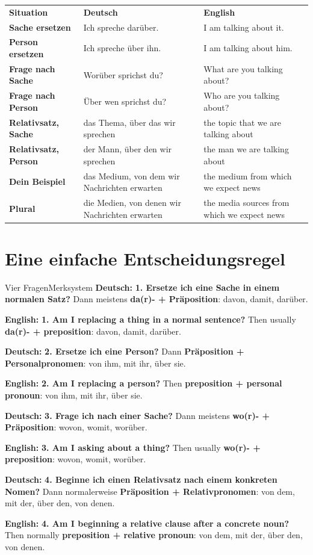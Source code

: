 \documentclass[a4paper,11pt]{article}
\newcommand{\GermanText}[1]{\textbf{Deutsch: }#1\par}
\newcommand{\EnglishText}[1]{{\small\color{SoftGray}\textbf{English: }#1\par}}
\begin{document}
        \begin{longtable}{>{\bfseries}p{3.3cm}|p{5.2cm}|p{5.2cm}}
            \rowcolor{HeaderBlueDark}
            \color{white}\textbf{Situation} &
            \color{white}\textbf{Deutsch} &
            \color{white}\textbf{English} \\
            Sache ersetzen & Ich spreche darüber. & I am talking about it. \\
            Person ersetzen & Ich spreche über ihn. & I am talking about him. \\
            Frage nach Sache & Worüber sprichst du? & What are you talking about? \\
            Frage nach Person & Über wen sprichst du? & Who are you talking about? \\
            Relativsatz, Sache & das Thema, über das wir sprechen & the topic that we are talking about \\
            Relativsatz, Person & der Mann, über den wir sprechen & the man we are talking about \\
            Dein Beispiel & das Medium, von dem wir Nachrichten erwarten & the medium from which we expect news \\
            Plural & die Medien, von denen wir Nachrichten erwarten & the media sources from which we expect news \\
        \end{longtable}

    \section{Eine einfache Entscheidungsregel}

        \begin{grammarentry}{Vier Fragen}{Merksystem}
            \GermanText{\textbf{1. Ersetze ich eine Sache in einem normalen Satz?} Dann meistens \textbf{da(r)- + Präposition}: davon, damit, darüber.}
            \EnglishText{\textbf{1. Am I replacing a thing in a normal sentence?} Then usually \textbf{da(r)- + preposition}: davon, damit, darüber.}

            \GermanText{\textbf{2. Ersetze ich eine Person?} Dann \textbf{Präposition + Personalpronomen}: von ihm, mit ihr, über sie.}
            \EnglishText{\textbf{2. Am I replacing a person?} Then \textbf{preposition + personal pronoun}: von ihm, mit ihr, über sie.}

            \GermanText{\textbf{3. Frage ich nach einer Sache?} Dann meistens \textbf{wo(r)- + Präposition}: wovon, womit, worüber.}
            \EnglishText{\textbf{3. Am I asking about a thing?} Then usually \textbf{wo(r)- + preposition}: wovon, womit, worüber.}

            \GermanText{\textbf{4. Beginne ich einen Relativsatz nach einem konkreten Nomen?} Dann normalerweise \textbf{Präposition + Relativpronomen}: von dem, mit der, über den, von denen.}
            \EnglishText{\textbf{4. Am I beginning a relative clause after a concrete noun?} Then normally \textbf{preposition + relative pronoun}: von dem, mit der, über den, von denen.}
        \end{grammarentry}
\end{document}

